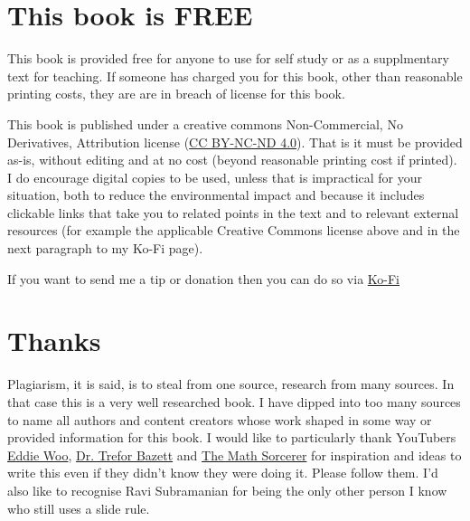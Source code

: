 \section*{\textbf{This book is FREE}}
This book is provided free for anyone to use for self study or as a supplmentary text for teaching.  If someone has charged you for this book, other than reasonable printing costs, they are are in breach of license for this book.

This book is published under a creative commons Non-Commercial, No Derivatives, Attribution license (\href{https://creativecommons.org/licenses/by-nc-nd/4.0/}{CC BY-NC-ND 4.0}).  That is it must be provided as-is, without editing and at no cost (beyond reasonable printing cost if printed). I do encourage digital copies to be used, unless that is impractical for your situation, both to reduce the environmental impact and because it includes clickable links that take you to related points in the text and to relevant external resources (for example the applicable Creative Commons license above and in the next paragraph to my Ko-Fi page).

If you want to send me a tip or donation then you can do so via  \href{https://ko-fi.com/stephenbooth}{Ko-Fi}

\section*{Thanks}
Plagiarism, it is said, is to steal from one source, research from many sources.  In that case this is a very well researched book.  I have dipped into too many sources to name all authors and content creators whose work shaped in some way or provided information for this book.  I would like to particularly thank YouTubers \href{https://www.youtube.com/c/misterwootube}{Eddie Woo}, \href{https://www.youtube.com/c/DrTreforBazett}{Dr. Trefor Bazett} and \href{https://www.youtube.com/c/TheMathSorcerer}{The Math Sorcerer} for inspiration and ideas to write this even if they didn't know they were doing it.  Please follow them.  I'd also like to recognise Ravi Subramanian for being the only other person I know who still uses a slide rule.